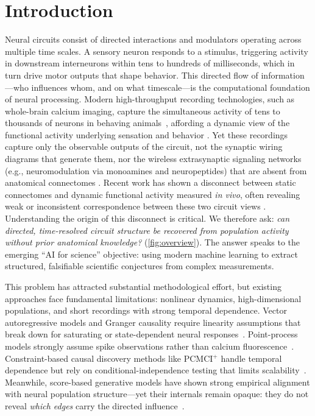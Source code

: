 \documentclass{article}
\theoremstyle{plain}
\theoremstyle{definition}
\theoremstyle{remark}
\newcommand{\1}{\mathbf{1}}
\begin{document}
\section{Introduction}
\label{sec:intro}
\vspace{-1mm}

Neural circuits consist of directed interactions and modulators operating across multiple time scales. A sensory neuron responds to a stimulus, triggering activity in downstream interneurons within tens to hundreds of milliseconds, which in turn drive motor outputs that shape behavior. This directed flow of information---who influences whom, and on what timescale---is the computational foundation of neural processing. Modern high-throughput recording technologies, such as whole-brain calcium imaging, capture the simultaneous activity of tens to thousands of neurons in behaving animals~\citep{Siegle2021,Semedo2019, susoy2021natural}, affording a dynamic view of the functional activity underlying sensation and behavior \cite{flavell2022dynamic}. Yet these recordings capture only the observable outputs of the circuit, not the synaptic wiring diagrams that generate them, nor the wireless extrasynaptic signaling networks (e.g., neuromodulation via monoamines and neuropeptides) that are absent from anatomical connectomes \cite{bargmann2012beyond, bargmann2013connectome, venkatesh2025c, bentley2016multilayer, ripoll2023neuropeptidergic}. Recent work has shown a disconnect between static connectomes and dynamic functional activity measured \textit{in vivo}, often revealing weak or inconsistent correspondence between these two circuit views \cite{Yemini2021, susoy2021natural, uzel2022set, Randi2023, currier2025infrequent}. Understanding the origin of this disconnect is critical. We therefore ask: \emph{can directed, time-resolved circuit structure be recovered from population activity without prior anatomical knowledge?} (\cref{fig:overview}). The answer speaks to the emerging ``AI for science'' objective: using modern machine learning to extract structured, falsifiable scientific conjectures from complex measurements.

This problem has attracted substantial methodological effort, but existing approaches face fundamental limitations: nonlinear dynamics, high-dimensional populations, and short recordings with strong temporal dependence. Vector autoregressive models and Granger causality require linearity assumptions that break down for saturating or state-dependent neural responses~\citep{Granger1969,Lutkepohl2005}. Point-process models strongly assume spike observations rather than calcium fluorescence~\citep{Hawkes1971}. Constraint-based causal discovery methods like PCMCI$^+$ handle temporal dependence but rely on conditional-independence testing that limits scalability~\citep{Runge2020PCMCIplus}. Meanwhile, score-based generative models have shown strong empirical alignment with neural population structure---yet their internals remain opaque: they do not reveal \emph{which edges} carry the directed influence~\citep{Ozcelik2023,Kapoor2024}.
\end{document}

